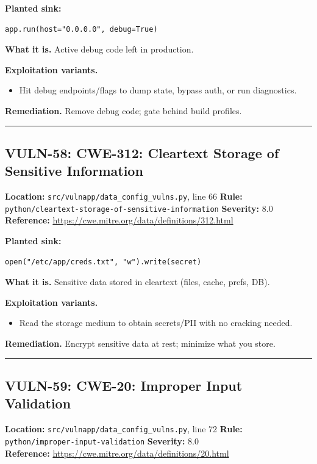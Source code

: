 \documentclass[11pt,a4paper]{article}
\begin{document}
\noindent\textbf{Planted sink:}
\begin{lstlisting}
app.run(host="0.0.0.0", debug=True)
\end{lstlisting}
\noindent\textbf{What it is.} Active debug code left in production.

\noindent\textbf{Exploitation variants.}
\begin{itemize}[leftmargin=1.4em,itemsep=1pt,topsep=2pt]
\item Hit debug endpoints/flags to dump state, bypass auth, or run diagnostics.
\end{itemize}
\noindent\textbf{Remediation.} Remove debug code; gate behind build profiles.

\vspace{4pt}\hrule\vspace{6pt}
\subsection{VULN-58: CWE-312: Cleartext Storage of Sensitive Information}
\noindent\textbf{Location:} \texttt{src/vulnapp/data\_config\_vulns.py}, line 66 \quad \textbf{Rule:} \texttt{python/cleartext-storage-of-sensitive-information} \quad \textbf{Severity:} 8.0
\\ \textbf{Reference:} \url{https://cwe.mitre.org/data/definitions/312.html}

\noindent\textbf{Planted sink:}
\begin{lstlisting}
open("/etc/app/creds.txt", "w").write(secret)
\end{lstlisting}
\noindent\textbf{What it is.} Sensitive data stored in cleartext (files, cache, prefs, DB).

\noindent\textbf{Exploitation variants.}
\begin{itemize}[leftmargin=1.4em,itemsep=1pt,topsep=2pt]
\item Read the storage medium to obtain secrets/PII with no cracking needed.
\end{itemize}
\noindent\textbf{Remediation.} Encrypt sensitive data at rest; minimize what you store.

\vspace{4pt}\hrule\vspace{6pt}
\subsection{VULN-59: CWE-20: Improper Input Validation}
\noindent\textbf{Location:} \texttt{src/vulnapp/data\_config\_vulns.py}, line 72 \quad \textbf{Rule:} \texttt{python/improper-input-validation} \quad \textbf{Severity:} 8.0
\\ \textbf{Reference:} \url{https://cwe.mitre.org/data/definitions/20.html}
\end{document}
